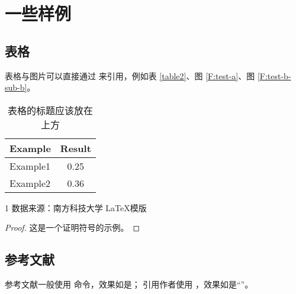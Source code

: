 
\section{一些样例}

\subsection{表格}

表格与图片可以直接通过 \verbbox{\ref{<key>}} 来引用，例如表 \ref{table2}、图 \ref{F:test-a}、图 \ref{F:test-b-sub-b}。

\begin{table}[htb]
  \centering
  \caption{表格的标题应该放在上方}
  \label{table}
  \begin{tabular}{lc} %
    \toprule
    Example & Result \\
    \midrule
    Example1          & 0.25 \\
    Example2          & 0.36 \\
    \bottomrule
  \end{tabular}
\end{table}

\begin{table}[htb]
  \centering
  \caption{带表注的表格的标题}
  \label{table2}
  \begin{threeparttable}
    \begin{tablenotes}
    \item[1] 数据来源：南方科技大学 \LaTeX 模版 %
    \end{tablenotes}
  \end{threeparttable}
\end{table}

\begin{proof}
  这是一个证明符号的示例。
\end{proof}

\subsection{参考文献}

参考文献一般使用  命令，效果如是\cite{Nicholas1998Handbook}；
引用作者使用 ，效果如是“\citeauthor{goossens1994latex}”。
